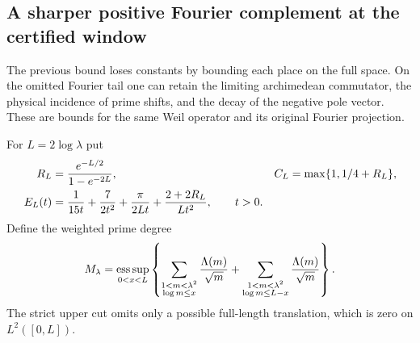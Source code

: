 \subsection*{A sharper positive Fourier complement at the certified window}
The previous bound loses constants by bounding each place on the full
space. On the omitted Fourier tail one can retain the limiting
archimedean commutator, the physical incidence of prime shifts, and the
decay of the negative pole vector. These are bounds for the same Weil
operator and its original Fourier projection.

For $L=2\log\lambda$ put
\begin{align}
 R_L&=\frac{e^{-L/2}}{1-e^{-2L}},&
 C_L&=\max\{1,1/4+R_L\},\notag\\
 E_L(t)&=\frac1{15t}+\frac7{2t^2}
       +\frac\pi{2Lt}+\frac{2+2R_L}{Lt^2},\qquad t>0.
 \label{eq:v115-arch-errors}
\end{align}
Define the weighted prime degree
\begin{equation}\label{eq:v115-prime-degree}
 M_\lambda=\mathop{\rm ess\,sup}_{0<x<L}
 \left\{\sum_{\substack{1<m<\lambda^2\\\log m\le x}}
                    \frac{\Lambda(m)}{\sqrt m}
       +\sum_{\substack{1<m<\lambda^2\\\log m\le L-x}}
                    \frac{\Lambda(m)}{\sqrt m}\right\}.
\end{equation}
The strict upper cut omits only a possible full-length translation,
which is zero on $L^2([0,L])$.

